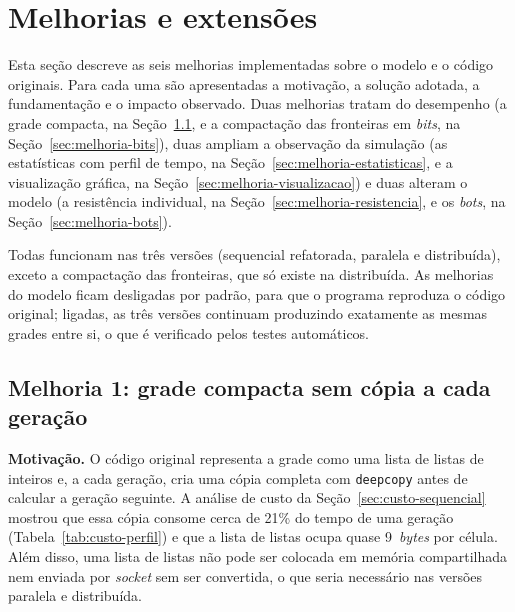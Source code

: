 
\chapter{Melhorias e extensões}\label{cap:melhorias}

Esta seção descreve as seis melhorias implementadas sobre o modelo e o código originais. Para cada uma são apresentadas a motivação, a solução adotada, a fundamentação e o impacto observado. Duas melhorias tratam do desempenho (a grade compacta, na Seção~\ref{sec:melhoria-grade}, e a compactação das fronteiras em \textit{bits}, na Seção~\ref{sec:melhoria-bits}), duas ampliam a observação da simulação (as estatísticas com perfil de tempo, na Seção~\ref{sec:melhoria-estatisticas}, e a visualização gráfica, na Seção~\ref{sec:melhoria-visualizacao}) e duas alteram o modelo (a resistência individual, na Seção~\ref{sec:melhoria-resistencia}, e os \textit{bots}, na Seção~\ref{sec:melhoria-bots}).

Todas funcionam nas três versões (sequencial refatorada, paralela e distribuída), exceto a compactação das fronteiras, que só existe na distribuída. As melhorias do modelo ficam desligadas por padrão, para que o programa reproduza o código original; ligadas, as três versões continuam produzindo exatamente as mesmas grades entre si, o que é verificado pelos testes automáticos.

\section{Melhoria 1: grade compacta sem cópia a cada geração}\label{sec:melhoria-grade}

\textbf{Motivação.} O código original representa a grade como uma lista de listas de inteiros e, a cada geração, cria uma cópia completa com \texttt{deepcopy} antes de calcular a geração seguinte. A análise de custo da Seção~\ref{sec:custo-sequencial} mostrou que essa cópia consome cerca de 21\% do tempo de uma geração (Tabela~\ref{tab:custo-perfil}) e que a lista de listas ocupa quase 9~\textit{bytes} por célula. Além disso, uma lista de listas não pode ser colocada em memória compartilhada nem enviada por \textit{socket} sem ser convertida, o que seria necessário nas versões paralela e distribuída.


